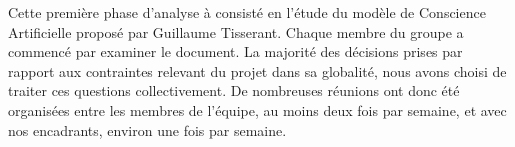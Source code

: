 Cette première phase d'analyse à consisté en l'étude du modèle de Conscience Artificielle proposé par Guillaume Tisserant. Chaque membre du groupe a commencé par examiner le document. La majorité des décisions prises par rapport aux contraintes relevant du projet dans sa globalité, nous avons choisi de traiter ces questions collectivement. De nombreuses réunions ont donc été organisées entre les membres de l'équipe, au moins deux fois par semaine, et avec nos encadrants, environ une fois par semaine.
